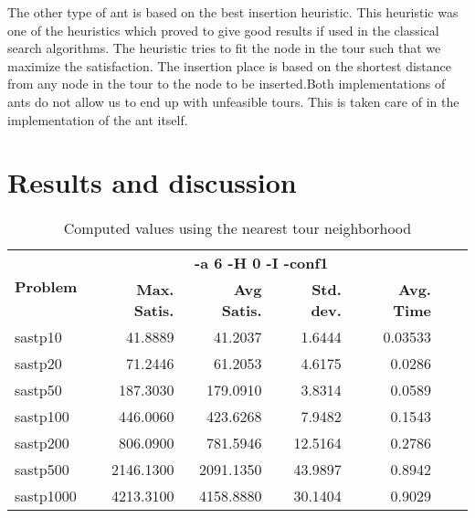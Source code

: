 \documentclass{article}
\begin{document}
The other type of ant is based on the best insertion heuristic. This heuristic was one of the heuristics which proved to give good results if used in the classical search algorithms. The heuristic tries to fit the node in the tour such that we maximize the satisfaction. The insertion place is based on the shortest distance from any node in the tour to the node to be inserted.Both implementations of ants do not allow us to end up with unfeasible tours. This is taken care of in the implementation of the ant itself. 



\section{Results and discussion}


\begin{table}[b!]
  \vspace{-6mm}%
  \caption{Computed values using the nearest tour neighborhood}
  \label{tab:NearestTour}
  \setlength{\tabcolsep}{1.4mm}
  \centering
  \begin{tabular}{lrrrrrr}
   \multirow{2}{*}{\bfseries Problem} &
      \multicolumn{4}{c}{\bfseries -a 6 -H 0 -I -conf1 } \\
    &
    \bfseries Max. Satis. &
    \bfseries Avg Satis. &
    \bfseries Std. dev. &
    \bfseries Avg. Time 
    \\\hline
    sastp10 & 41.8889 & 41.2037 & 1.6444 & 0.03533 \\ 
	sastp20 & 71.2446 & 61.2053 & 4.6175 & 0.0286 \\ 
	sastp50 & 187.3030 & 179.0910 & 3.8314 & 0.0589 \\ 
	sastp100 & 446.0060 & 423.6268 & 7.9482 & 0.1543 \\ 
	sastp200 & 806.0900 & 781.5946 & 12.5164 & 0.2786 \\ 
	sastp500 & 2146.1300 & 2091.1350 & 43.9897 & 0.8942 \\ 
	sastp1000 & 4213.3100 & 4158.8880 & 30.1404 & 0.9029 

    \\\hline
  \end{tabular}

\end{table}
\end{document}
